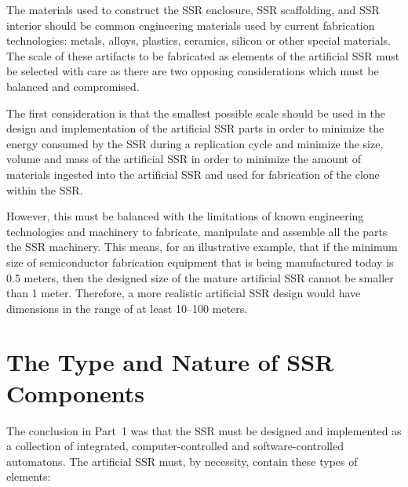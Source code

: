 The materials used to construct the SSR enclosure, SSR scaffolding, and
SSR interior should be common engineering materials used by current
fabrication technologies: metals, alloys, plastics, ceramics, silicon
or other special materials.  The scale of these artifacts to be fabricated 
as elements of the artificial SSR must be selected with care as there
are two opposing considerations which must be balanced and compromised.

The first consideration is that the 
smallest possible scale should be used in the design and
implementation of the artificial SSR parts in order to
minimize the energy consumed by the SSR during a replication cycle and minimize the size, volume and mass of the artificial SSR in order to minimize the amount of materials ingested into the artificial SSR and used for fabrication of the clone within the SSR.

However, this must be balanced with the limitations of 
known engineering technologies and machinery to fabricate,
manipulate and assemble all the parts the SSR machinery. This
means, for an illustrative example, that if the minimum size of 
semiconductor fabrication equipment that is being manufactured today is
0.5 meters, then the designed size of the mature artificial SSR cannot
be smaller than 1 meter. Therefore, a more realistic artificial
SSR design would have dimensions in the range of at least 10--100
meters.

\section{The Type and Nature of SSR Components}

The conclusion in Part~1 was that the SSR must be designed and implemented as
a collection of integrated, computer-controlled and software-controlled
automatons. 
The artificial SSR must,
by necessity, contain these types of elements:


